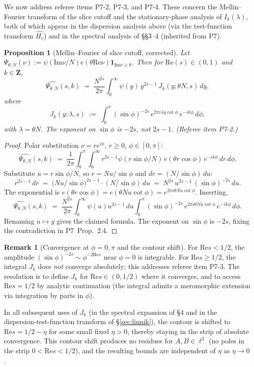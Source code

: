 \documentclass[11pt]{article}
\newtheorem{proposition}[theorem]{Proposition}
\theoremstyle{definition}
\newtheorem{remark}[theorem]{Remark}
\newcommand{\Z}{\mathbf{Z}}
\renewcommand{\Re}{\mathrm{Re}}
\renewcommand{\Im}{\mathrm{Im}}
\begin{document}
We now address referee items P7-2, P7-3, and P7-4. These concern the Mellin--Fourier transform of the slice cutoff and the stationary-phase analysis of $I_k(\lambda)$, both of which appear in the dispersion analysis above (via the test-function transform $\widehat{H_c}$) and in the spectral analysis of \S\S3--4 (inherited from P7).

\begin{proposition}[Mellin--Fourier of slice cutoff, corrected]\label{prop:mellin-fixed}
Let $\Psi_{\theta,N}(\nu):=\psi(\Im\nu/N)e(\theta\Re\nu)\mathbf{1}_{\Im\nu\ge 0}$. Then for $\Re(s)\in(0,1)$ and $k\in\Z$,
\[
\widehat{\Psi_{\theta,N}}(s,k)\;=\;\frac{N^{2s}}{2\pi}\int_0^\infty\psi(y)\,y^{2s-1}\,J_k(y;\theta N,s)\,dy,
\]
where
\begin{equation}\label{eq:Jk-corrected}
J_k(y;\lambda,s)\;:=\;\int_0^\pi(\sin\phi)^{-2s}\,e^{2\pi i\lambda y\cot\phi}\,e^{-ik\phi}\,d\phi,
\end{equation}
with $\lambda=\theta N$. The exponent on $\sin\phi$ is $-2s$, \emph{not} $2s-1$. (Referee item P7-2.)
\end{proposition}

\begin{proof}
Polar substitution $\nu=re^{i\phi}$, $r\ge 0$, $\phi\in[0,\pi]$:
\[
\widehat{\Psi_{\theta,N}}(s,k)\;=\;\frac{1}{2\pi}\int_0^\pi\int_0^\infty r^{2s-1}\psi(r\sin\phi/N)\,e(\theta r\cos\phi)\,e^{-ik\phi}\,dr\,d\phi.
\]
Substitute $u=r\sin\phi/N$, so $r=Nu/\sin\phi$ and $dr=(N/\sin\phi)\,du$:
\[
r^{2s-1}\,dr\;=\;\bigl(Nu/\sin\phi\bigr)^{2s-1}\cdot(N/\sin\phi)\,du\;=\;N^{2s}\,u^{2s-1}\,(\sin\phi)^{-2s}\,du.
\]
The exponential is $e(\theta r\cos\phi)=e(\theta Nu\cot\phi)=e^{2\pi i\theta Nu\cot\phi}$. Inserting,
\[
\widehat{\Psi_{\theta,N}}(s,k)\;=\;\frac{N^{2s}}{2\pi}\int_0^\infty\psi(u)u^{2s-1}\,du\int_0^\pi(\sin\phi)^{-2s}\,e^{2\pi i\theta Nu\cot\phi}\,e^{-ik\phi}\,d\phi.
\]
Renaming $u\mapsto y$ gives the claimed formula. The exponent on $\sin\phi$ is $-2s$, fixing the contradiction in P7~Prop.\ 2.4.
\end{proof}

\begin{remark}[Convergence at $\phi=0,\pi$ and the contour shift]\label{rem:Jk-convergence}
For $\Re s<1/2$, the amplitude $(\sin\phi)^{-2s}\sim\phi^{-2\Re s}$ near $\phi=0$ is integrable. For $\Re s\ge 1/2$, the integral $J_k$ does \emph{not} converge absolutely; this addresses referee item P7-3. The resolution is to define $J_k$ for $\Re s\in(0,1/2)$ where it converges, and to access $\Re s=1/2$ by analytic continuation (the integral admits a meromorphic extension via integration by parts in $\phi$).

In all subsequent uses of $J_k$ (in the spectral expansion of \S4 and in the dispersion-test-function transform of \S\ref{sec:linnik}), the contour is shifted to $\Re s=1/2-\eta$ for some small fixed $\eta>0$, thereby staying in the strip of absolute convergence. This contour shift produces no residues for $A,B\in\ell^2$ (no poles in the strip $0<\Re s<1/2$), and the resulting bounds are independent of $\eta$ as $\eta\to 0$.
\end{remark}
\end{document}
